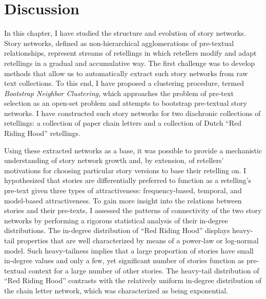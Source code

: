 \section{Discussion}\label{sec:networks-discussion}

In this chapter, I have studied the structure and evolution of story networks. Story networks, defined as non-hierarchical agglomerations of pre-textual relationships, represent streams of retellings in which retellers modify and adapt retellings in a gradual and accumulative way. The first challenge was to develop methods that allow us to automatically extract such story networks from raw text collections. To this end, I have proposed a clustering procedure, termed \emph{Bootstrap Neighbor Clustering}, which approaches the problem of pre-text selection as an open-set problem and attempts to bootstrap pre-textual story networks. I have constructed such story networks for two diachronic collections of retellings: a collection of paper chain letters and a collection of Dutch ``Red Riding Hood'' retellings. 

Using these extracted networks as a base, it was possible to provide a mechanistic understanding of story network growth and, by extension, of retellers' motivations for choosing particular story versions to base their retelling on. I hypothesized that stories are differentially preferred to function as a retelling's pre-text given three types of attractiveness: frequency-based, temporal, and model-based attractiveness. To gain more insight into the relations between stories and their pre-texts, I assessed the patterns of connectivity of the two story networks by performing a rigorous statistical analysis of their in-degree distributions. The in-degree distribution of ``Red Riding Hood'' displays heavy-tail properties that are well characterized by means of a power-law or log-normal model. Such heavy-tailness implies that a large proportion of stories have small in-degree values and only a few, yet significant number of stories function as pre-textual context for a large number of other stories. The heavy-tail distribution of ``Red Riding Hood'' contrasts with the relatively uniform in-degree distribution of the chain letter network, which was characterized as being exponential. 


